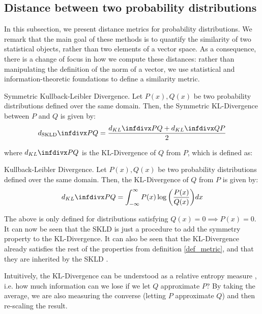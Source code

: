 \documentclass[../main.tex]{subfiles} \label{chapter_soa}
\begin{document}
\subsection{Distance between two probability distributions}\label{subsection_pdfdist}
In this subsection, we present distance metrics for probability distributions. We remark that the main goal of these methods is to quantify the similarity of two statistical objects, rather than two elements of a vector space. As a consequence, there is a change of focus in how we compute these distances: rather than manipulating the definition of the norm of a vector, we use statistical and information-theoretic foundations to define a similarity metric. 
\begin{definition}{Symmetric Kullback-Leibler Divergence.} \label{def_skld1}
Let $P(x), Q(x)$ be two probability distributions defined over the same domain. Then, the Symmetric KL-Divergence between $P$ and $Q$ is given by:
\begin{align*}
d_{\text{SKLD}}\infdiv{P}{Q} = \frac{d_{KL}\infdiv{P}{Q} + d_{KL}\infdiv{Q}{P}}{2}
\end{align*}
\end{definition}
where $d_{KL}\infdiv{P}{Q}$ is the KL-Divergence of $Q$ from $P$, which is defined as:
\begin{definition}{Kullback-Leibler Divergence.} \label{def_kld1}
Let $P(x), Q(x)$ be two probability distributions defined over the same domain. Then, the KL-Divergence of $Q$ from $P$ is given by:
\begin{align*}
d_{KL}\infdiv{P}{Q} = \int_{-\infty}^{\infty}P(x)\log{\left(\frac{P(x)}{Q(x)}\right)}dx
\end{align*}
\end{definition}
\par The above is only defined for distributions satisfying $Q(x) = 0 \implies P(x) = 0$. It can now be seen that the SKLD is just a procedure to add the symmetry property to the KL-Divergence. It can also be seen that the KL-Divergence already satisfies the rest of the properties from definition \ref{def_metric}, and that they are inherited by the SKLD \cite{Hershey2007}. 
\par Intuitively, the KL-Divergence can be understood as a relative entropy measure \cite{Divergence2008}, i.e. how much information can we lose if we let $Q$ approximate $P$? By taking the average, we are also measuring the converse (letting $P$ approximate $Q$) and then re-scaling the result.
\end{document}
